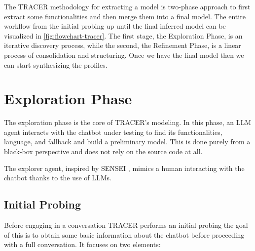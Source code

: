 The \ac{TRACER} methodology for extracting a model is two-phase approach
to first extract some functionalities and then merge them into a final model.
The entire workflow from the initial probing up until the final inferred model
can be visualized in \autoref{fig:flowchart-tracer}.
The first stage, the Exploration Phase, is an iterative discovery process,
while the second, the Refinement Phase, is a linear process of consolidation and structuring.
Once we have the final model then we can start synthesizing the profiles.


\section{Exploration Phase}\label{sec:exploration}

The exploration phase is the core of \ac{TRACER}'s modeling.
In this phase, an \ac{LLM} agent interacts with the chatbot under testing
to find its functionalities, language, and fallback
and build a preliminary model.
This is done purely from a black-box perspective
and does not rely on the source code at all.

The explorer agent, inspired by SENSEI
\autocite{delaraSensei, delaraAutomatedEndtoEndTesting2025},
mimics a human interacting with the chatbot
thanks to the use of \acp{LLM}.



\subsection{Initial Probing}

Before engaging in a conversation
\ac{TRACER} performs an initial probing
the goal of this is to obtain some basic information
about the chatbot before proceeding with a full conversation.
It focuses on two elements:

